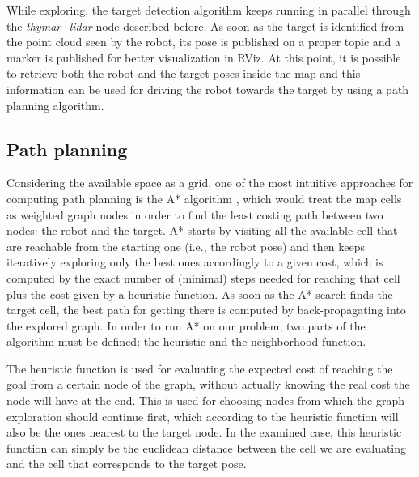 \documentclass[9pt,conference]{IEEEtran}
\begin{document}
While exploring, the target detection algorithm keeps running in parallel through the \textit{thymar\_lidar} node described before. As soon as the target is identified from the point cloud seen by the robot, its pose is published on a proper topic and a marker is published for better visualization in RViz. At this point, it is possible to retrieve both the robot and the target poses inside the map and this information can be used for driving the robot towards the target by using a path planning algorithm.


\subsection{Path planning}
\label{sec:path-planning}

Considering the available space as a grid, one of the most intuitive approaches for computing path planning is the A* algorithm \cite{wiki-A*}, which would treat the map cells as weighted graph nodes in order to find the least costing path between two nodes: the robot and the target. A* starts by visiting all the available cell that are reachable from the starting one (i.e., the robot pose) and then keeps iteratively exploring only the best ones accordingly to a given cost, which is computed by the exact number of (minimal) steps needed for reaching that cell plus the cost given by a heuristic function. As soon as the A* search finds the target cell, the best path for getting there is computed by back-propagating into the explored graph. In order to run A* on our problem, two parts of the algorithm must be defined: the heuristic and the neighborhood function. 

The heuristic function is used for evaluating the expected cost of reaching the goal from a certain node of the graph, without actually knowing the real cost the node will have at the end. This is used for choosing nodes from which the graph exploration should continue first, which according to the heuristic function will also be the ones nearest to the target node. In the examined case, this heuristic function can simply be the euclidean distance between the cell we are evaluating and the cell that corresponds to the target pose.
\end{document}
